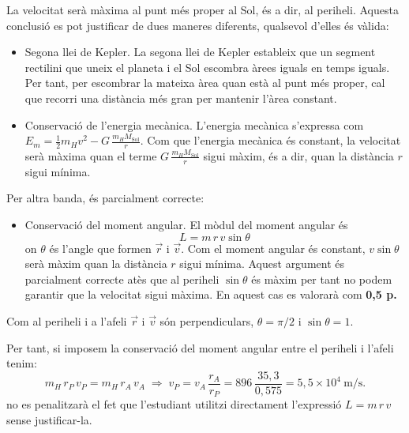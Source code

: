\begin{solapartat}
 La velocitat serà màxima al punt més proper al Sol, és a dir, al periheli. Aquesta conclusió es pot justificar de dues maneres diferents, qualsevol d'elles és vàlida:
\begin{itemize}
\item Segona llei de Kepler. La segona llei de Kepler estableix que un segment rectilini que uneix el planeta i el Sol escombra àrees iguals en temps iguals. Per tant, per escombrar la mateixa àrea quan està al punt més proper, cal que recorri una distància més gran per mantenir l'àrea constant.
\item Conservació de l'energia mecànica. L'energia mecànica s'expressa com $E_m = \frac{1}{2} m_H v^2 - G\,\frac{m_H M_\mathrm{Sol}}{r}$. Com que l'energia mecànica és constant, la velocitat serà màxima quan el terme $G\,\frac{m_H M_\mathrm{Sol}}{r}$ sigui màxim, és a dir, quan la distància $r$ sigui mínima.
\end{itemize}
Per altra banda, és parcialment correcte:
\begin{itemize}
\item Conservació del moment angular. El mòdul del moment angular és
\[ L = m\,r\,v\sin\theta \]
on $\theta$ és l'angle que formen $\vec{r}$ i $\vec{v}$. Com el moment angular és constant, $v\sin\theta$ serà màxim quan la distància $r$ sigui mínima. Aquest argument és parcialment correcte atès que al periheli $\sin\theta$ és màxim per tant no podem garantir que la velocitat sigui màxima. En aquest cas es valorarà com \textcolor{red!70!black}{\textbf{0,5 p.}}
\end{itemize}

 Com al periheli i a l'afeli $\vec{r}$ i $\vec{v}$ són perpendiculars, $\theta = \pi/2$ i $\sin\theta = 1$.

Per tant, si imposem la conservació del moment angular entre el periheli i l'afeli tenim:
\[ m_H\,r_P\,v_P = m_H\,r_A\,v_A \;\Rightarrow\; v_P = v_A\,\frac{r_A}{r_P} = 896\,\frac{35,3}{0,575} = 5,5\times 10^{4}\ \mathrm{m/s}. \]
 no es penalitzarà el fet que l'estudiant utilitzi directament l'expressió $L = m\,r\,v$ sense justificar-la.


\end{solapartat}

